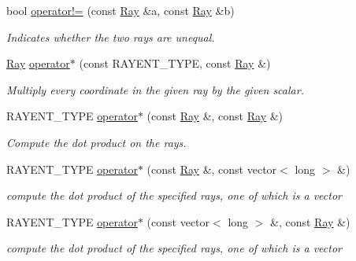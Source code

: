 \begin{DoxyCompactItemize}
bool \hyperlink{namespace_l_p___solvers_a20a1994c15aacbfd4215abf13fdf1e6d}{operator!=} (const \hyperlink{group___c_l_s_solvers_class_l_p___solvers_1_1_ray}{Ray} \&a, const \hyperlink{group___c_l_s_solvers_class_l_p___solvers_1_1_ray}{Ray} \&b)
\begin{DoxyCompactList}\small\item\em Indicates whether the two rays are unequal. \end{DoxyCompactList}\item 
\hyperlink{group___c_l_s_solvers_class_l_p___solvers_1_1_ray}{Ray} \hyperlink{group___c_l_s_solvers_gaf71a7e68f920518b02b6a58660594ca2}{operator$\ast$} (const R\+A\+Y\+E\+N\+T\+\_\+\+T\+Y\+PE, const \hyperlink{group___c_l_s_solvers_class_l_p___solvers_1_1_ray}{Ray} \&)
\begin{DoxyCompactList}\small\item\em Multiply every coordinate in the given ray by the given scalar. \end{DoxyCompactList}\item 
R\+A\+Y\+E\+N\+T\+\_\+\+T\+Y\+PE \hyperlink{group___c_l_s_solvers_gaae1f5d07b6d0f4c12b4c7835977b64eb}{operator$\ast$} (const \hyperlink{group___c_l_s_solvers_class_l_p___solvers_1_1_ray}{Ray} \&, const \hyperlink{group___c_l_s_solvers_class_l_p___solvers_1_1_ray}{Ray} \&)
\begin{DoxyCompactList}\small\item\em Compute the dot product on the rays. \end{DoxyCompactList}\item 
R\+A\+Y\+E\+N\+T\+\_\+\+T\+Y\+PE \hyperlink{group___c_l_s_solvers_ga9b4f6991b325c2a42e1f14fc09346277}{operator$\ast$} (const \hyperlink{group___c_l_s_solvers_class_l_p___solvers_1_1_ray}{Ray} \&, const vector$<$ long $>$ \&)
\begin{DoxyCompactList}\small\item\em compute the dot product of the specified rays, one of which is a vector \end{DoxyCompactList}\item 
R\+A\+Y\+E\+N\+T\+\_\+\+T\+Y\+PE \hyperlink{group___c_l_s_solvers_gab64c33abcc54e5b175b7b567e099c75b}{operator$\ast$} (const vector$<$ long $>$ \&, const \hyperlink{group___c_l_s_solvers_class_l_p___solvers_1_1_ray}{Ray} \&)
\begin{DoxyCompactList}\small\item\em compute the dot product of the specified rays, one of which is a vector \end{DoxyCompactList}\item 

\end{DoxyCompactItemize}

